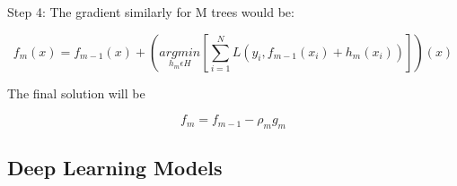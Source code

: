 \documentclass[pdflatex,sn-mathphys-num]{sn-jnl}%
\begin{document}
\begin{enumerate}[label=(\roman*),itemsep=10pt]
Step 4: The gradient similarly for M trees would be:

\begin{equation}
f_m (x) = f_{m-1} (x) + \left(\underset{h_{m}\epsilon H}{argmin} \left[ \sum ^{N}_{i=1}L(y_i,f_{m-1}(x_i)+h_m(x_i)) \right]\right)(x)
\end{equation}

The final solution will be

\begin{equation}
f_m = f_{m-1}-\rho_m g_m
\end{equation}

\end{enumerate}


\subsection{Deep Learning Models}\label{subsec3}
\end{document}
